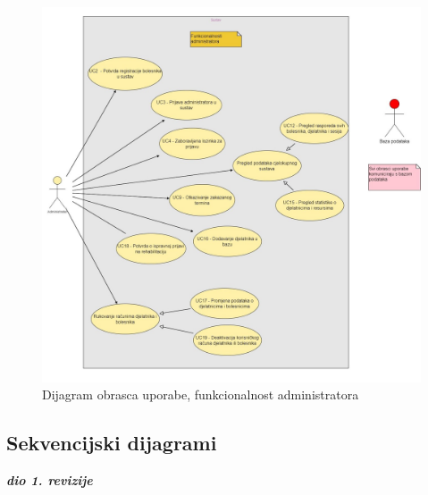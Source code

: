 \begin{figure}[p]
    \centering
    \includegraphics[width=\textwidth]{./slike/UC Dijagram - Administrator} 
    \caption{Dijagram obrasca uporabe, funkcionalnost administratora}
    \label{fig:my_image}
\end{figure}
\eject

\subsection{Sekvencijski dijagrami}

\textbf{\textit{dio 1. revizije}}\\

